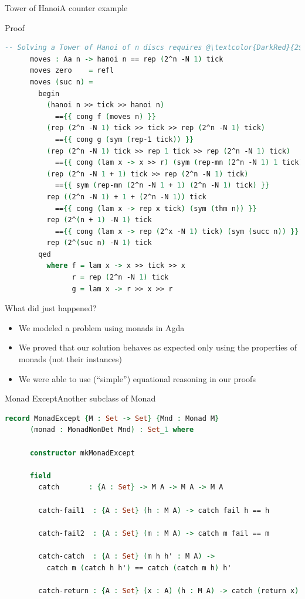 \documentclass{beamer}
\begin{document}
\begin{frame}[fragile]{Tower of Hanoi}{A counter example}
  \begin{block}{Proof}
    \begin{lstlisting}[language=Agda, mathescape]
      -- Solving a Tower of Hanoi of n discs requires @\textcolor{DarkRed}{2$^n$-1}@ moves
      moves : Aa n -> hanoi n == rep (2^n -N 1) tick
      moves zero    = refl
      moves (suc n) =
        begin
          (hanoi n >> tick >> hanoi n)
            =={{ cong f (moves n) }}
          (rep (2^n -N 1) tick >> tick >> rep (2^n -N 1) tick)
            =={{ cong g (sym (rep-1 tick)) }}
          (rep (2^n -N 1) tick >> rep 1 tick >> rep (2^n -N 1) tick)
            =={{ cong (lam x -> x >> r) (sym (rep-mn (2^n -N 1) 1 tick)) }}
          (rep (2^n -N 1 + 1) tick >> rep (2^n -N 1) tick)
            =={{ sym (rep-mn (2^n -N 1 + 1) (2^n -N 1) tick) }}
          rep ((2^n -N 1) + 1 + (2^n -N 1)) tick
            =={{ cong (lam x -> rep x tick) (sym (thm n)) }}
          rep (2^(n + 1) -N 1) tick
            =={{ cong (lam x -> rep (2^x -N 1) tick) (sym (succ n)) }}
          rep (2^(suc n) -N 1) tick
        qed
          where f = lam x -> x >> tick >> x
                r = rep (2^n -N 1) tick
                g = lam x -> r >> x >> r
    \end{lstlisting}
  \end{block}
\end{frame}

\begin{frame}{What did just happened?}
  \begin{itemize}
  \item We modeled a problem using monads in Agda
  \item We proved that our solution behaves as expected only using the
    properties of monads (not their instances)
  \item We were able to use (``simple'') equational reasoning in our proofs
  \end{itemize}
\end{frame}

\begin{frame}[fragile]{Monad Except}{Another subclass of Monad}
  \begin{lstlisting}[language=Agda, mathescape]
    record MonadExcept {M : Set -> Set} {Mnd : Monad M}
      (monad : MonadNonDet Mnd) : Set_1 where

      constructor mkMonadExcept

      field
        catch       : {A : Set} -> M A -> M A -> M A

        catch-fail1  : {A : Set} (h : M A) -> catch fail h == h

        catch-fail2  : {A : Set} (m : M A) -> catch m fail == m

        catch-catch  : {A : Set} (m h h' : M A) ->
          catch m (catch h h') == catch (catch m h) h'

        catch-return : {A : Set} (x : A) (h : M A) -> catch (return x) h == return x
  \end{lstlisting}
\end{frame}
\end{document}
